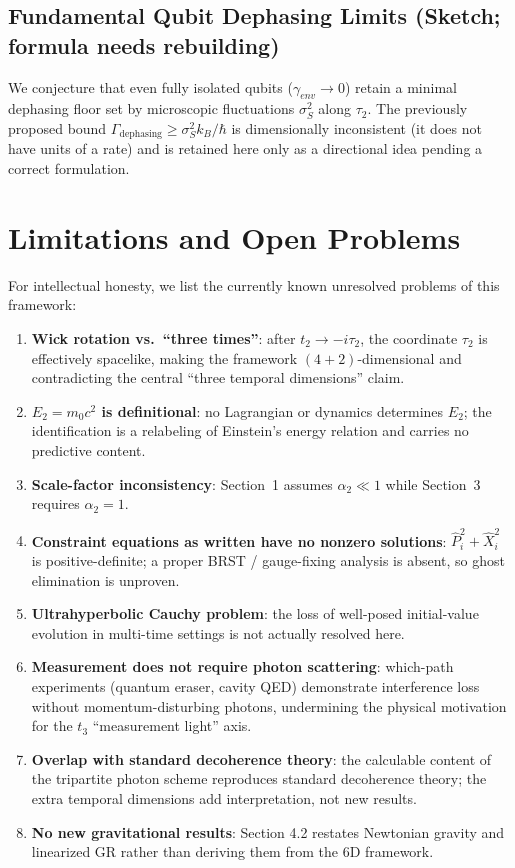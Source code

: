 \documentclass[11pt,a4paper]{article}
\begin{document}
\subsection{Fundamental Qubit Dephasing Limits (Sketch; formula needs rebuilding)}
We conjecture that even fully isolated qubits ($\gamma_{env} \to 0$) retain a minimal dephasing floor set by microscopic fluctuations $\sigma_S^2$ along $\tau_2$. The previously proposed bound $\Gamma_{\text{dephasing}} \ge \sigma_S^2 k_B / \hbar$ is dimensionally inconsistent (it does not have units of a rate) and is retained here only as a directional idea pending a correct formulation.

\section{Limitations and Open Problems}
\label{sec:limitations}

For intellectual honesty, we list the currently known unresolved problems of this framework:

\begin{enumerate}
\item \textbf{Wick rotation vs.\ ``three times''}: after $t_2 \to -i\tau_2$, the coordinate $\tau_2$ is effectively spacelike, making the framework $(4+2)$-dimensional and contradicting the central ``three temporal dimensions'' claim.
\item \textbf{$E_2 = m_0 c^2$ is definitional}: no Lagrangian or dynamics determines $E_2$; the identification is a relabeling of Einstein's energy relation and carries no predictive content.
\item \textbf{Scale-factor inconsistency}: Section~1 assumes $\alpha_2 \ll 1$ while Section~3 requires $\alpha_2 = 1$.
\item \textbf{Constraint equations as written have no nonzero solutions}: $\hat{P}_i^2 + \hat{X}_i^2$ is positive-definite; a proper BRST / gauge-fixing analysis is absent, so ghost elimination is unproven.
\item \textbf{Ultrahyperbolic Cauchy problem}: the loss of well-posed initial-value evolution in multi-time settings \cite{Tegmark1997} is not actually resolved here.
\item \textbf{Measurement does not require photon scattering}: which-path experiments (quantum eraser, cavity QED) demonstrate interference loss without momentum-disturbing photons, undermining the physical motivation for the $t_3$ ``measurement light'' axis.
\item \textbf{Overlap with standard decoherence theory}: the calculable content of the tripartite photon scheme reproduces standard decoherence theory; the extra temporal dimensions add interpretation, not new results.
\item \textbf{No new gravitational results}: Section 4.2 restates Newtonian gravity and linearized GR rather than deriving them from the 6D framework.
\end{enumerate}
\end{document}
